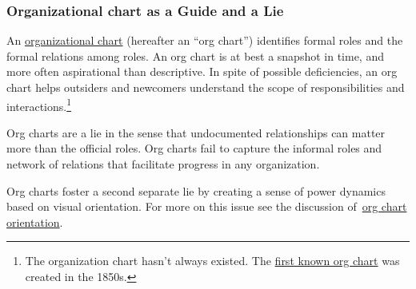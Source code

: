 \subsubsection*{Organizational chart as a Guide and a Lie\label{sec:org-chart-as-guide-and-lie}}

An \href{https://en.wikipedia.org/wiki/Organizational_chart}{organizational chart} (hereafter an ``\gls{org chart}'') identifies formal roles and the formal relations among roles. An org chart is at best a snapshot in time, and more often aspirational than descriptive. In spite of possible deficiencies, an org chart helps outsiders and newcomers understand the scope of responsibilities and interactions.\footnote{The organization chart hasn't always existed. The \href{https://en.wikipedia.org/wiki/George_Holt_Henshaw\#First_organization_chart}{first known org chart} was created in the 1850s.}

Org charts are a lie in the sense that undocumented relationships can matter more than the official roles. Org charts fail to capture the informal roles and network of relations that facilitate progress in any organization. 

Org charts foster a second separate lie by creating a sense of power dynamics based on visual orientation. For more on this issue see the discussion of~\hyperref[sec:org-chart-orientation]{org chart orientation}.
